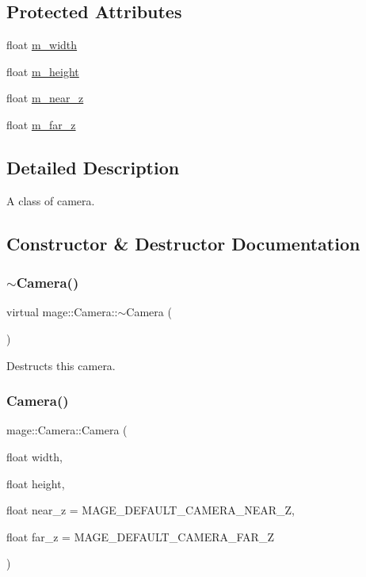 \subsection*{Protected Attributes}
\begin{DoxyCompactItemize}
\item 
float \hyperlink{classmage_1_1_camera_acc8f371214af02fdac9a1ff04508c4ca}{m\+\_\+width}
\item 
float \hyperlink{classmage_1_1_camera_a48485eca596702f0e5985ec8b7db35a5}{m\+\_\+height}
\item 
float \hyperlink{classmage_1_1_camera_a685f8700a29d1f1eff2bec353c3ec970}{m\+\_\+near\+\_\+z}
\item 
float \hyperlink{classmage_1_1_camera_abe2eeca725ce3da238256007454b241f}{m\+\_\+far\+\_\+z}
\end{DoxyCompactItemize}


\subsection{Detailed Description}
A class of camera. 

\subsection{Constructor \& Destructor Documentation}
\hypertarget{classmage_1_1_camera_ae56c0542ae1a480c7fb15d737bf16de0}{}\label{classmage_1_1_camera_ae56c0542ae1a480c7fb15d737bf16de0} 
\subsubsection{\texorpdfstring{$\sim$\+Camera()}{~Camera()}}
{\footnotesize\ttfamily virtual mage\+::\+Camera\+::$\sim$\+Camera (\begin{DoxyParamCaption}{ }\end{DoxyParamCaption})\hspace{0.3cm}{\ttfamily [virtual]}}

Destructs this camera. \hypertarget{classmage_1_1_camera_a64980217b5ae3817affab70eb3e61342}{}\label{classmage_1_1_camera_a64980217b5ae3817affab70eb3e61342} 
\subsubsection{\texorpdfstring{Camera()}{Camera()}}
{\footnotesize\ttfamily mage\+::\+Camera\+::\+Camera (\begin{DoxyParamCaption}\item[{float}]{width,  }\item[{float}]{height,  }\item[{float}]{near\+\_\+z = {\ttfamily MAGE\+\_\+DEFAULT\+\_\+CAMERA\+\_\+NEAR\+\_\+Z},  }\item[{float}]{far\+\_\+z = {\ttfamily MAGE\+\_\+DEFAULT\+\_\+CAMERA\+\_\+FAR\+\_\+Z} }\end{DoxyParamCaption})\hspace{0.3cm}{\ttfamily [protected]}}


